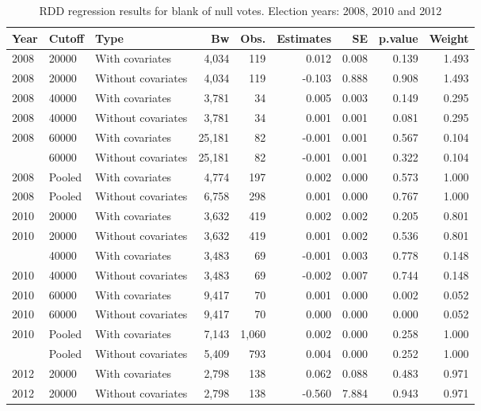 \documentclass[12pt,]{article}
\begin{document}
\begin{table}[!h]

\caption{\label{tab:r.pct.bn.dif}RDD regression results for blank of null votes. Election years: 2008, 2010 and 2012}
\centering
\begin{tabular}{lllrrrrrr}
\toprule
Year & Cutoff & Type & Bw & Obs. & Estimates & SE & p.value & Weight\\
\midrule
2008 & 20000 & With covariates & 4,034 & 119 & 0.012 & 0.008 & 0.139 & 1.493\\
2008 & 20000 & Without covariates & 4,034 & 119 & -0.103 & 0.888 & 0.908 & 1.493\\
2008 & 40000 & With covariates & 3,781 & 34 & 0.005 & 0.003 & 0.149 & 0.295\\
2008 & 40000 & Without covariates & 3,781 & 34 & 0.001 & 0.001 & 0.081 & 0.295\\
2008 & 60000 & With covariates & 25,181 & 82 & -0.001 & 0.001 & 0.567 & 0.104\\
\addlinespace
2008 & 60000 & Without covariates & 25,181 & 82 & -0.001 & 0.001 & 0.322 & 0.104\\
2008 & Pooled & With covariates & 4,774 & 197 & 0.002 & 0.000 & 0.573 & 1.000\\
2008 & Pooled & Without covariates & 6,758 & 298 & 0.001 & 0.000 & 0.767 & 1.000\\
2010 & 20000 & With covariates & 3,632 & 419 & 0.002 & 0.002 & 0.205 & 0.801\\
2010 & 20000 & Without covariates & 3,632 & 419 & 0.001 & 0.002 & 0.536 & 0.801\\
\addlinespace
2010 & 40000 & With covariates & 3,483 & 69 & -0.001 & 0.003 & 0.778 & 0.148\\
2010 & 40000 & Without covariates & 3,483 & 69 & -0.002 & 0.007 & 0.744 & 0.148\\
2010 & 60000 & With covariates & 9,417 & 70 & 0.001 & 0.000 & 0.002 & 0.052\\
2010 & 60000 & Without covariates & 9,417 & 70 & 0.000 & 0.000 & 0.000 & 0.052\\
2010 & Pooled & With covariates & 7,143 & 1,060 & 0.002 & 0.000 & 0.258 & 1.000\\
\addlinespace
2010 & Pooled & Without covariates & 5,409 & 793 & 0.004 & 0.000 & 0.252 & 1.000\\
2012 & 20000 & With covariates & 2,798 & 138 & 0.062 & 0.088 & 0.483 & 0.971\\
2012 & 20000 & Without covariates & 2,798 & 138 & -0.560 & 7.884 & 0.943 & 0.971\\

\end{tabular}
\end{table}
\end{document}
